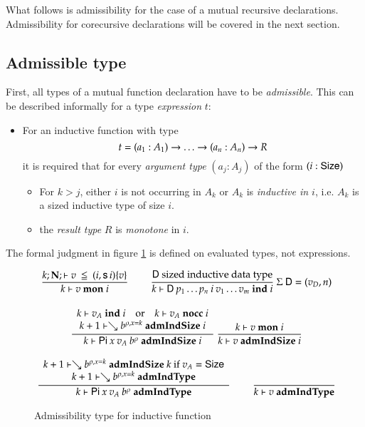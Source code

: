 \newcommand{\mon}[3]{#1\vdash#2\mbox{ \textbf{mon} }#3}
\newcommand{\indu}[3]{#1\vdash#2\mbox{ \textbf{ind} }#3}
\newcommand{\coind}[3]{#1\vdash#2\mbox{ \textbf{coind} }#3}
\newcommand{\admIndSize}[3]{#1\vdash#2\mbox{ \textbf{admIndSize} }#3}
\newcommand{\admCoSize}[3]{#1\vdash#2\mbox{ \textbf{admCoSize} }#3}
\newcommand{\admIndType}[2]{#1\vdash#2\mbox{ \textbf{admIndType}}}
\newcommand{\admCoType}[2]{#1\vdash#2\mbox{ \textbf{admCoType}}}

\newcommand{\sizePat}[1]{\vdash#1\mbox{ \textbf{sizePat}}}
\newcommand{\sizePats}[1]{\vdash#1\mbox{ \textbf{sizePats}}}

What follows is admissibility for the case of a mutual recursive declarations.
Admissibility for corecursive declarations will be covered in the next section.
\subsection{Admissible type}

First, all types of a mutual function declaration have to be \emph{admissible}.
This can be described informally for a type \emph{expression} $t$:
\begin{itemize}
\item
For an inductive function with type \[t = (a_1 : A_1) \rightarrow \ldots \rightarrow (a_n : A_n) \rightarrow R\]
it is required that for every \emph{argument type} $(a_j : A_j)$ of the form $(i : \mathsf{Size})$  
\begin{itemize}
\item
For $k>j$, either $i$ is not occurring in $A_k$ or $A_k$ is \emph{inductive in $i$}, i.e. $A_k$ is a sized inductive type of size $i$.
\item
the \emph{result type} $R$ is \emph{monotone} in $i$. 
\end{itemize}
\end{itemize}
The formal judgment in figure \ref{admi} is defined on evaluated types, not expressions.

\begin{figure}[htp]
\begin{gather*}
\nru{}
{\LeqVal{k}{\nF}{v}{\subst{(i,\s i)}{v}}}
{\mon{k}{v}{i}}
\qquad
\nru{}
{\DD \mbox{ sized inductive data type}}
{\indu{k}{\DD \: p_1 \ldots p_n \: i \: v_1 \ldots v_m}{i}}
{\: \Sig \: \DD = (v_D,n)}
\\[2ex]
\ndru{}
{\indu{k}{v_A}{i} \quad \mbox{or} \quad \nocc{k}{v_A}{i}}
{\admIndSize{k+1}{\wh \cl{b}{\ins{\rho}{x}{k}}}{i}}
{\admIndSize{k}{\vpi \: x \: v_A \: \cl{b}{\rho}}{i}}
\nru{}
{\mon{k}{v}{i}}
{\admIndSize{k}{v}{i}}
\\[2ex]
\ndru{}
{\admIndSize{k+1}{\wh \cl{b}{\ins{\rho}{x}{k}}}{k} \mbox{ if } v_A = \Size}
{\admIndType{k+1}{\wh \cl{b}{\ins{\rho}{x}{k}}}}
{\admIndType{k}{\vpi \: x \: v_A \: \cl{b}{\rho}}}
\qquad
\nru{}
{}
{\admIndType{k}{v}}
\end{gather*}
\caption{Admissibility type for inductive function}
\label{admi}
\end{figure}

